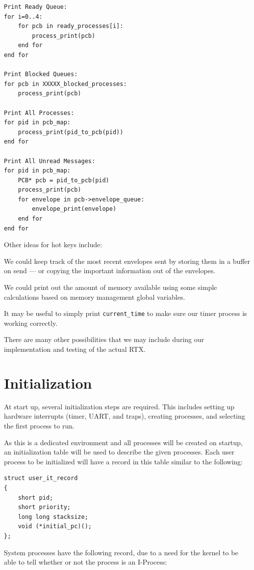 \documentclass[titlepage]{article}
\begin{document}
\begin{verbatim}
Print Ready Queue:
for i=0..4:
    for pcb in ready_processes[i]:
        process_print(pcb)
    end for
end for

Print Blocked Queues:
for pcb in XXXXX_blocked_processes:
    process_print(pcb)

Print All Processes:
for pid in pcb_map:
    process_print(pid_to_pcb(pid))
end for

Print All Unread Messages:
for pid in pcb_map:
    PCB* pcb = pid_to_pcb(pid)
    process_print(pcb)
    for envelope in pcb->envelope_queue:
        envelope_print(envelope)
    end for
end for
\end{verbatim}

Other ideas for hot keys include:

We could keep track of the most recent envelopes sent by storing them in a
buffer on send --- or copying the important information out of the envelopes.

We could print out the amount of memory available using some simple calculations
based on memory management global variables.

It may be useful to simply print \verb!current_time! to make sure our timer
process is working correctly.

There are many other possibilities that we may include during our implementation
and testing of the actual RTX.

\section{Initialization}
At start up, several initialization steps are required.  This includes setting
up hardware interrupts (timer, UART, and traps), creating processes, and
selecting the first process to run.

As this is a dedicated environment and all processes will be created on startup,
an initialization table will be used to describe the given processes. Each
user process to be initialized will have a record in this table similar to the
following:

\begin{verbatim}
struct user_it_record
{
    short pid;
    short priority;
    long long stacksize;
    void (*initial_pc)();
};
\end{verbatim}

System processes have the following record, due to a need for the kernel to be
able to tell whether or not the process is an I-Process:
\end{document}
